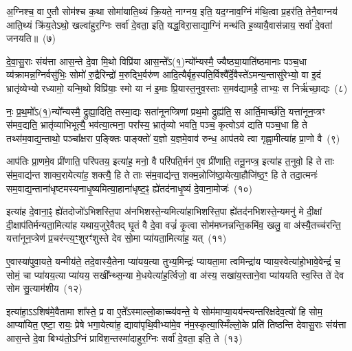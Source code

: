अ॒ग्निश्च॒ वा ए॒तौ सोम॑श्च क॒था सोमा॑याति॒थ्यं क्रि॒यते॒ नाग्नय॒ इति॒ यद॒ग्नाव॒ग्निं म॑थि॒त्वा प्र॒हर॑ति॒ तेनै॒वाग्नय॑ आति॒थ्यं क्रि॑य॒ते\-ऽथो॒ खल्वा॑हुर॒ग्निः सर्वा॑ दे॒वता॒ इति॒ यद्ध॒विरा॒साद्या॒ग्निं मन्थ॑ति ह॒व्यायै॒वास॑न्नाय॒ सर्वा॑ दे॒वता॑ जनयति॥~(७)\ip

{\anuvakamend[{पत्नि॑या ए॒व जग॑त्या॒ आ त्रि॒वृद्वै प॑रि॒धीन् व॑द॒न्त्येक॑चत्वारिꣳशच्च}]}

दे॒वा॒सु॒राः संय॑त्ता आस॒न्ते दे॒वा मि॒थो विप्रि॑या आस॒न्ते᳚\-ऽ(१॒)न्यो᳚न्यस्मै॒ ज्यैष्ठ्या॒याति॑ष्ठमानाः पञ्च॒धा व्य॑क्रामन्न॒ग्नि\-र्वसु॑भिः॒ सोमो॑ रु॒द्रैरिन्द्रो॑ म॒रुद्भि॒र्वरु॑ण आदि॒त्यैर्बृह॒स्पति॒र्विश्वै᳚र्दे॒वैस्ते॑\-ऽमन्य॒न्तासु॑रेभ्यो॒ वा इ॒दं भ्रातृ॑व्येभ्यो रध्यामो॒ यन्मि॒थो विप्रि॑याः॒ स्मो या न॑ इ॒माः प्रि॒यास्त॒नुव॒स्ताः स॒मव॑द्यामहै॒ ताभ्यः॒ स निर्\mbox{}ऋ॑च्छा॒द्यः~(८)\ip

नः॒ प्र॒थ॒मो᳚\-ऽ(१॒)न्यो᳚न्यस्मै॒ द्रुह्या॒दिति॒ तस्मा॒द्यः सता॑नूनप्त्रिणां प्रथ॒मो द्रुह्य॑ति॒ स आर्ति॒मार्च्छ॑ति॒ यत्ता॑नून॒प्त्रꣳ स॑मव॒द्यति॒ भ्रातृ॑व्याभिभूत्यै॒ भव॑त्या॒त्मना॒ परा᳚स्य॒ भ्रातृ॑व्यो भवति॒ पञ्च॒ कृत्वो\-ऽव॑ द्यति पञ्च॒धा हि ते तथ्स॑म॒वाद्य॒न्ताथो॒ पञ्चा᳚क्षरा प॒ङ्क्तिः पाङ्क्तो॑ य॒ज्ञो य॒ज्ञमे॒वाव॑ रुन्ध॒ आप॑तये त्वा गृह्णा॒मीत्या॑ह प्रा॒णो वै~(९)\ip

आप॑तिः प्रा॒णमे॒व प्री॑णाति॒ परि॑पतय॒ इत्या॑ह॒ मनो॒ वै परि॑पति॒र्मन॑ ए॒व प्री॑णाति॒ तनू॒नप्त्र॒ इत्या॑ह त॒नुवो॒ हि ते ताः स॑म॒वाद्य॑न्त शाक्व॒रायेत्या॑ह॒ शक्त्यै॒ हि ते ताः स॑म॒वाद्य॑न्त॒ शक्म॒न्नोजि॑ष्ठा॒येत्या॒हौजि॑ष्ठ॒ꣳ॒ हि ते तदा॒त्मनः॑ सम॒वाद्य॒न्ताना॑धृष्टमस्यनाधृ॒ष्यमित्या॒हाना॑धृष्ट॒ꣴ॒ ह्ये॑तद॑नाधृ॒ष्यं दे॒वाना॒मोजः॑~(१०)\ip

इत्या॑ह दे॒वाना॒ꣴ॒ ह्ये॑तदोजो॑\-ऽभिशस्ति॒पा अ॑नभिशस्ते॒न्यमित्या॑हाभिशस्ति॒पा ह्ये॑तद॑नभिशस्ते॒न्यमनु॑ मे दी॒क्षां दी॒क्षाप॑तिर्मन्यता॒मित्या॑ह यथाय॒जुरे॒वैतद् घृ॒तं वै दे॒वा वज्रं॑ कृ॒त्वा सोम॑मघ्नन्नन्ति॒कमि॑व॒ खलु॒ वा अ॑स्यै॒तच्च॑रन्ति॒ यत्ता॑नून॒प्त्रेण॑ प्र॒चर॑न्त्य॒ꣳ॒शुरꣳ॑शुस्ते देव सो॒मा प्या॑यता॒मित्या॑ह॒ यत्~(११)\ip

ए॒वास्या॑पुवा॒यते॒ यन्मीय॑ते॒ तदे॒वास्यै॒तेना प्या॑यय॒त्या तुभ्य॒मिन्द्रः॑ प्यायता॒मा त्वमिन्द्रा॑य प्याय॒स्वेत्या॑हो॒भावे॒वेन्द्रं॑ च॒ सोमं॒ चा प्या॑यय॒त्या प्या॑यय॒ सखी᳚न्थ्स॒न्या मे॒धयेत्या॑ह॒र्त्विजो॒ वा अ॑स्य॒ सखा॑य॒स्ताने॒वा प्या॑ययति स्व॒स्ति ते॑ देव सोम सु॒त्याम॑शीय~(१२)\ip

इत्या॑हा॒\-ऽऽ\-शिष॑मे॒वैतामा शा᳚स्ते॒ प्र वा ए॒ते᳚\-ऽस्माल्लो॒काच्च्य॑वन्ते॒ ये सोम॑\-माप्या॒यय॑न्त्यन्त\-रिक्षदेव॒त्यो॑ हि सोम॒ आप्या॑यित॒ एष्टा॒ रायः॒ प्रेषे भगा॒येत्या॑ह॒ द्यावा॑\-पृथि॒वीभ्या॑मे॒व न॑म॒स्कृत्या॒स्मिँल्लो॒के प्रति॑ तिष्ठन्ति देवासु॒राः संय॑त्ता आस॒न्ते दे॒वा बिभ्य॑तो॒\-ऽग्निं प्रावि॑श॒न्तस्मा॑दाहुर॒ग्निः सर्वा॑ दे॒वता॒ इति॒ ते~(१३)\ip


